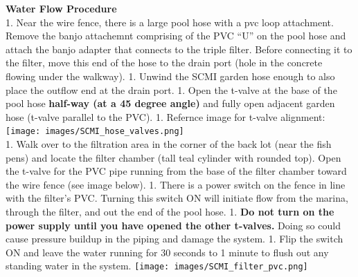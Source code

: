 \documentclass[]{book}
\begin{document}
 \textbf{Water Flow Procedure}\\
1. Near the wire fence, there is a large pool hose with a pvc loop
attachment. Remove the banjo attachemnt comprising of the PVC ``U'' on
the pool hose and attach the banjo adapter that connects to the triple
filter. Before connecting it to the filter, move this end of the hose to
the drain port (hole in the concrete flowing under the walkway). 1.
Unwind the SCMI garden hose enough to also place the outflow end at the
drain port. 1. Open the t-valve at the base of the pool hose
\textbf{half-way (at a 45 degree angle)} and fully open adjacent garden
hose (t-valve parallel to the PVC). 1. Refernce image for t-valve
alignment: \texttt{[image: images/SCMI\_hose\_valves.png]}\\
1. Walk over to the filtration area in the corner of the back lot (near
the fish pens) and locate the filter chamber (tall teal cylinder with
rounded top). Open the t-valve for the PVC pipe running from the base of
the filter chamber toward the wire fence (see image below). 1. There is
a power switch on the fence in line with the filter's PVC. Turning this
switch ON will initiate flow from the marina, through the filter, and
out the end of the pool hose. 1. \textbf{Do not turn on the power supply
until you have opened the other t-valves.} Doing so could cause pressure
buildup in the piping and damage the system. 1. Flip the switch ON and
leave the water running for 30 seconds to 1 minute to flush out any
standing water in the system.
\texttt{[image: images/SCMI\_filter\_pvc.png]}
\end{document}
